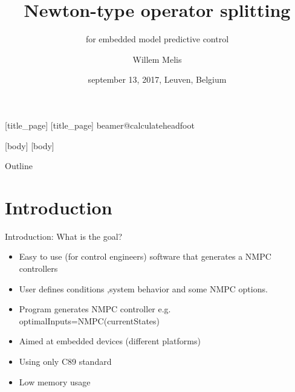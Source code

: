 \documentclass[11pt,t]{beamer}
\title{Newton-type operator splitting }
\author{Willem Melis}
\institute{KU Leuven}
\subtitle{for embedded model predictive control }
\date{september 13, 2017, Leuven, Belgium}
\begin{document}
	[title_page]
	[title_page]
	\csname beamer@calculateheadfoot\endcsname %
		\begin{frame}
			\titlepage
		\end{frame}
	[body]
	[body]


\begin{frame}{Outline}
	\vskip 5mm
	\hfill	{\large \parbox{.95\textwidth}{\tableofcontents[hideallsubsections]}}
\end{frame}
\section{Introduction}
\begin{frame}{Introduction: What is the goal?}
\begin{itemize}
	\item Easy to use (for control engineers) software that generates a NMPC controllers
	\item User defines conditions ,system behavior and some NMPC options.
	\item Program generates NMPC controller e.g. optimalInputs=NMPC(currentStates)
	\item Aimed at embedded devices (different platforms)
	\item Using only C89 standard
	\item Low memory usage
\end{itemize}
\end{frame}
\end{document}
